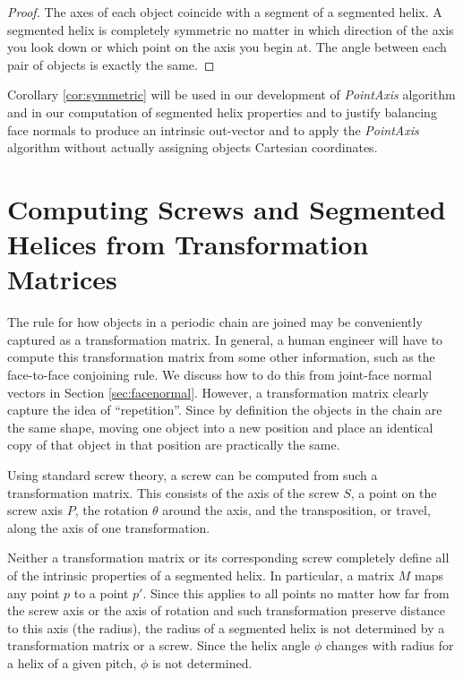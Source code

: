 \documentclass[11pt]{article}
\begin{document}
{\begin{proof}
  The axes of each object coincide with a segment of a segmented helix.
  A segmented helix is completely symmetric no matter in which direction
  of the axis you look down or which point on the axis you begin at. The angle between each pair of objects
  is exactly the same.
\end{proof}

Corollary \ref{cor:symmetric} will be used in our development of {\em PointAxis} algorithm
and in our computation of segmented helix properties and to justify balancing face normals
to produce an intrinsic out-vector and to apply the {\em PointAxis} algorithm
without actually assigning objects Cartesian coordinates.

\section{Computing Screws and Segmented Helices from Transformation Matrices}

The rule for how objects in a periodic chain are joined may be conveniently captured as a transformation
matrix. In general, a human engineer will have to compute this transformation matrix from some other
information, such as the face-to-face conjoining rule. We discuss how to do this from joint-face normal
vectors in Section \ref{sec:facenormal}. However, a transformation matrix clearly
capture the idea of ``repetition''. Since by definition the objects in the chain are the same shape,
moving one object into a new position and place an identical copy of that object in that position
are practically the same.

Using standard screw theory\cite{wittenburg2016kinematics,wiki:screwaxis}, a screw can be computed from such
a transformation matrix. This consists of the axis of the screw $S$, a point on the screw axis $P$,
the rotation $\theta$ around the axis, and the
transposition, or travel, along the axis of one transformation.

Neither a transformation matrix or its corresponding screw
completely define all of the intrinsic
properties of a segmented helix. In particular, a matrix $M$ maps any point $p$ to a point $p'$.
Since this applies to all points no matter how far from the screw axis or the axis of rotation and
such transformation preserve distance to this axis (the radius), the radius of a segmented helix
is not determined by a transformation matrix or a screw. Since the helix angle $\phi$ changes
with radius for a helix of a given pitch, $\phi$ is not determined.

}
\end{document}
